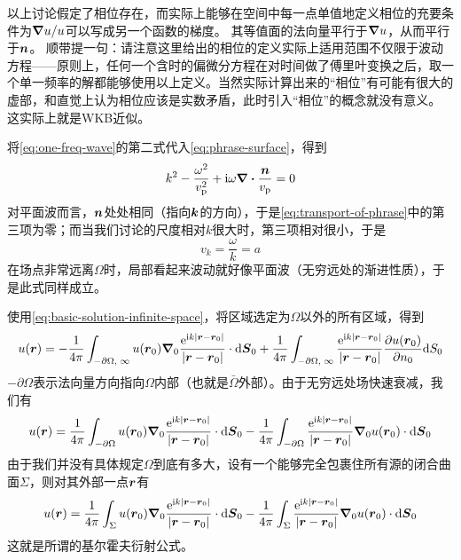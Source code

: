 \documentclass[UTF8]{ctexart}
\newcommand*{\ii}{\mathrm{i}}
\newcommand*{\ee}{\mathrm{e}}
\begin{document}
以上讨论假定了相位存在，而实际上能够在空间中每一点单值地定义相位的充要条件为$\grad{u} / u$可以写成另一个函数的梯度。
其等值面的法向量平行于$\grad{u}$，从而平行于$\vb*{n}$。
顺带提一句：请注意这里给出的相位的定义实际上适用范围不仅限于波动方程——原则上，任何一个含时的偏微分方程在对时间做了傅里叶变换之后，取一个单一频率的解都能够使用以上定义。当然实际计算出来的“相位”有可能有很大的虚部，和直觉上认为相位应该是实数矛盾，此时引入“相位”的概念就没有意义。
这实际上就是WKB近似。

将\eqref{eq:one-freq-wave}的第二式代入\eqref{eq:phrase-surface}，得到
\begin{equation}
    k^2 - \frac{\omega^2}{v_\text{p}^2} + \ii \omega \div{\frac{\vb*{n}}{v_\text{p}}} = 0
    \label{eq:transport-of-phrase}
\end{equation}
对平面波而言，$\vb*{n}$处处相同（指向$\vb*{k}$的方向），于是\eqref{eq:transport-of-phrase}中的第三项为零；而当我们讨论的尺度相对$k$很大时，第三项相对很小，于是
\begin{equation}
    v_k = \frac{\omega}{k} = a
\end{equation}
在场点非常远离$\Omega$时，局部看起来波动就好像平面波（无穷远处的渐进性质），于是此式同样成立。

使用\eqref{eq:basic-solution-infinite-space}，将区域选定为$\Omega$以外的所有区域，得到
\[
    u(\vb*{r}) = 
    - \frac{1}{4\pi} \int_{ - \partial \Omega, \; \infty} u(\vb*{r}_0) \grad_0{\frac{\ee^{\ii k \abs{\vb*{r} - \vb*{r}_0}}}{\abs{\vb*{r} - \vb*{r}_0}}} \cdot \dd \vb*{S}_0 
    + \frac{1}{4\pi} \int_{- \partial \Omega, \; \infty} \frac{\ee^{\ii k \abs{\vb*{r} - \vb*{r}_0}}}{\abs{\vb*{r} - \vb*{r}_0}} \pdv{u(\vb*{r}_0)}{n_0} \dd S_0
\]
$-\partial \Omega$表示法向量方向指向$\Omega$内部（也就是$\bar{\Omega}$外部）。由于无穷远处场快速衰减，我们有
\[
    u(\vb*{r}) = 
    \frac{1}{4\pi} \int_{- \partial \Omega} u(\vb*{r}_0) \grad_0{\frac{\ee^{\ii k \abs{\vb*{r} - \vb*{r}_0}}}{\abs{\vb*{r} - \vb*{r}_0}}} \cdot \dd \vb*{S}_0 
    - \frac{1}{4\pi} \int_{- \partial \Omega} \frac{\ee^{\ii k \abs{\vb*{r} - \vb*{r}_0}}}{\abs{\vb*{r} - \vb*{r}_0}} \grad_0{u(\vb*{r}_0)} \cdot \dd{\vb*{S}_0}
\]
由于我们并没有具体规定$\Omega$到底有多大，设有一个能够完全包裹住所有源的闭合曲面$\Sigma$，则对其外部一点$\vb*{r}$有
\begin{equation}
    u(\vb*{r}) = 
    \frac{1}{4\pi} \int_{\Sigma} u(\vb*{r}_0) \grad_0{\frac{\ee^{\ii k \abs{\vb*{r} - \vb*{r}_0}}}{\abs{\vb*{r} - \vb*{r}_0}}} \cdot \dd \vb*{S}_0 
    - \frac{1}{4\pi} \int_{\Sigma} \frac{\ee^{\ii k \abs{\vb*{r} - \vb*{r}_0}}}{\abs{\vb*{r} - \vb*{r}_0}} \grad_0{u(\vb*{r}_0)} \cdot \dd{\vb*{S}_0}
    \label{eq:kirchhoff-eq}
\end{equation}
这就是所谓的基尔霍夫衍射公式。
\end{document}
